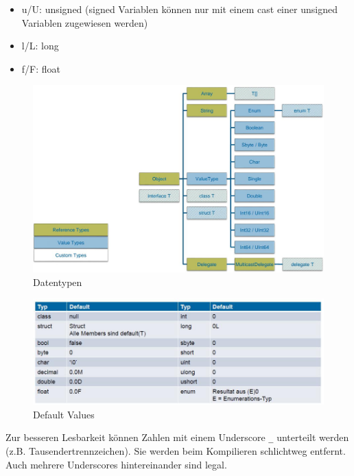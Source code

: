 \documentclass[
a4paper,
oneside,
10pt,
fleqn,
headsepline,
toc=listofnumbered, 
bibliography=totocnumbered]{scrartcl}
\begin{document}
\begin{itemize}
	\item u/U: unsigned (signed Variablen können nur mit einem cast einer unsigned Variablen zugewiesen werden)
	\item l/L: long
	\item f/F: float
\end{itemize}
\begin{figure}[h!]
\centering
\includegraphics[width=0.8\linewidth]{images/datatypes}
\caption{Datentypen}
\label{fig:datatypes}
\end{figure}

\begin{figure}[h!]
\centering
\includegraphics[width=\linewidth]{images/default_values}
\caption{Default Values}
\label{fig:defaultvalues}
\end{figure}

Zur besseren Lesbarkeit können Zahlen mit einem Underscore \lstinline|_| unterteilt werden (z.B. Tausendertrennzeichen). Sie werden beim Kompilieren schlichtweg entfernt. Auch mehrere Underscores hintereinander sind legal.

\newpage
\end{document}
